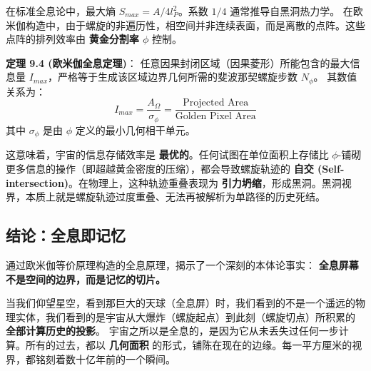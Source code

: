在标准全息论中，最大熵 $S_{max} = A / 4l_P^2$。系数 $1/4$ 通常推导自黑洞热力学。
在欧米伽构造中，由于螺旋的非遍历性，相空间并非连续表面，而是离散的点阵。这些点阵的排列效率由 \textbf{黄金分割率 $\phi$} 控制。

\textbf{定理 9.4 (欧米伽全息定理)}：
任意因果封闭区域（因果菱形）所能包含的最大信息量 $I_{max}$，严格等于生成该区域边界几何所需的斐波那契螺旋步数 $N_{\phi}$。
其数值关系为：
\[I_{max} = \frac{A_{\Omega}}{\sigma_{\phi}} = \frac{\text{Projected Area}}{\text{Golden Pixel Area}}\]
其中 $\sigma_{\phi}$ 是由 $\phi$ 定义的最小几何相干单元。

这意味着，宇宙的信息存储效率是 \textbf{最优的}。任何试图在单位面积上存储比 $\phi$-铺砌更多信息的操作（即超越黄金密度的压缩），都会导致螺旋轨迹的 \textbf{自交 (Self-intersection)}。在物理上，这种轨迹重叠表现为 \textbf{引力坍缩}，形成黑洞。黑洞视界，本质上就是螺旋轨迹过度重叠、无法再被解析为单路径的历史死结。

\subsection{结论：全息即记忆}

通过欧米伽等价原理构造的全息原理，揭示了一个深刻的本体论事实：
\textbf{全息屏幕不是空间的边界，而是记忆的切片。}

当我们仰望星空，看到那巨大的天球（全息屏）时，我们看到的不是一个遥远的物理实体，我们看到的是宇宙从大爆炸（螺旋起点）到此刻（螺旋切点）所积累的 \textbf{全部计算历史的投影}。
宇宙之所以是全息的，是因为它从未丢失过任何一步计算。所有的过去，都以 \textbf{几何面积} 的形式，铺陈在现在的边缘。每一平方厘米的视界，都铭刻着数十亿年前的一个瞬间。
